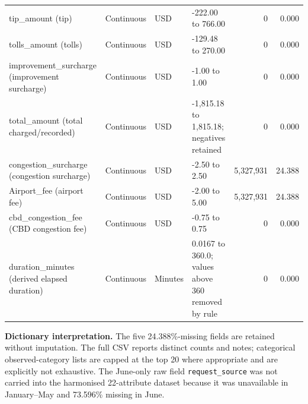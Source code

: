 \documentclass[10pt,a4paper]{article}
\newcommand{\code}[1]{\texttt{#1}}
\begin{document}
\begin{longtable}{@{}p{3.7cm}p{1.35cm}p{1.25cm}p{6.0cm}r r@{}}
tip\_amount (tip) & Continuous & USD & -222.00 to 766.00 & 0 & 0.000\\
tolls\_amount (tolls) & Continuous & USD & -129.48 to 270.00 & 0 & 0.000\\
improvement\_surcharge (improvement surcharge) & Continuous & USD & -1.00 to 1.00 & 0 & 0.000\\
total\_amount (total charged/recorded) & Continuous & USD & -1,815.18 to 1,815.18; negatives retained & 0 & 0.000\\
congestion\_surcharge (congestion surcharge) & Continuous & USD & -2.50 to 2.50 & 5,327,931 & 24.388\\
Airport\_fee (airport fee) & Continuous & USD & -2.00 to 5.00 & 5,327,931 & 24.388\\
cbd\_congestion\_fee (CBD congestion fee) & Continuous & USD & -0.75 to 0.75 & 0 & 0.000\\
duration\_minutes (derived elapsed duration) & Continuous & Minutes & 0.0167 to 360.0; values above 360 removed by rule & 0 & 0.000\\
\end{longtable}
\normalsize
\textbf{Dictionary interpretation.} The five 24.388\%-missing fields are retained without imputation. The full CSV reports distinct counts and notes; categorical observed-category lists are capped at the top 20 where appropriate and are explicitly not exhaustive. The June-only raw field \code{request\_source} was not carried into the harmonised 22-attribute dataset because it was unavailable in January--May and 73.596\% missing in June.
\end{document}
